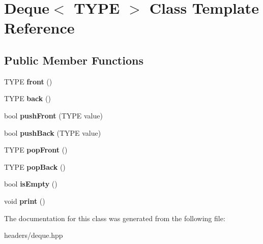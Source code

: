 \hypertarget{classDeque}{}\section{Deque$<$ T\+Y\+P\+E $>$ Class Template Reference}
\label{classDeque}
\subsection*{Public Member Functions}
\begin{DoxyCompactItemize}
\item 
\hypertarget{classDeque_a2ab7584c2060bddce6c7a694581d508e}{}T\+Y\+P\+E {\bfseries front} ()\label{classDeque_a2ab7584c2060bddce6c7a694581d508e}

\item 
\hypertarget{classDeque_ad57cc8e84adbdc9dc8e264c31a9c0355}{}T\+Y\+P\+E {\bfseries back} ()\label{classDeque_ad57cc8e84adbdc9dc8e264c31a9c0355}

\item 
\hypertarget{classDeque_acceec8cc8d040953ddfb7516d4b944f9}{}bool {\bfseries push\+Front} (T\+Y\+P\+E value)\label{classDeque_acceec8cc8d040953ddfb7516d4b944f9}

\item 
\hypertarget{classDeque_ae6482601774d8ae90ab463ecb5dc1806}{}bool {\bfseries push\+Back} (T\+Y\+P\+E value)\label{classDeque_ae6482601774d8ae90ab463ecb5dc1806}

\item 
\hypertarget{classDeque_ae648898904ffade62b687e1629ca3635}{}T\+Y\+P\+E {\bfseries pop\+Front} ()\label{classDeque_ae648898904ffade62b687e1629ca3635}

\item 
\hypertarget{classDeque_ac5ff7a0e4b4890d23408772ca1803602}{}T\+Y\+P\+E {\bfseries pop\+Back} ()\label{classDeque_ac5ff7a0e4b4890d23408772ca1803602}

\item 
\hypertarget{classDeque_a900f936eb1346f4fd6d082193967e0be}{}bool {\bfseries is\+Empty} ()\label{classDeque_a900f936eb1346f4fd6d082193967e0be}

\item 
\hypertarget{classDeque_ad8c0765727446ec51ae5ff0c367663d5}{}void {\bfseries print} ()\label{classDeque_ad8c0765727446ec51ae5ff0c367663d5}

\end{DoxyCompactItemize}


The documentation for this class was generated from the following file\+:\begin{DoxyCompactItemize}
\item 
headers/deque.\+hpp\end{DoxyCompactItemize}
